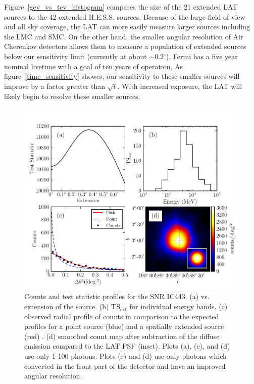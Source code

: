 \documentclass[12pt,preprint]{aastex}
\newcommand{\gev}{\text{GeV}\xspace}
\newcommand{\tev}{\text{TeV}\xspace}
\newcommand{\tsext}{{\ensuremath{\text{TS}_{\text{ext}}}}\xspace}
\newcommand{\ts}{\text{TS}\xspace}
\renewcommand{\deg}{\ensuremath{^\circ}\xspace}
\renewcommand{\approx}{\sim\!\xspace}
\begin{document}
Figure~\ref{gev_vs_tev_histogram} compares the size of the 21 extended
LAT sources to the 42 extended H.E.S.S. sources.  Because of the large
field of view and all sky coverage, the LAT can more easily measure
larger sources including the LMC and SMC.  On the other hand, the smaller
angular resolution of Air Cherenkov detectors allows them to measure a
population of extended sources below our sensitivity limit (currently at
about $\approx0.2\deg$).  Fermi has a five year nominal livetime with a
goal of ten years of operation.  As figure~\ref{time_sensitivity} showes,
our sensitivity to these smaller sources will improve by a factor greater
than $\sqrt{t}$.  With increased exposure, the LAT will likely begin to
resolve these smaller \tev sources.





\clearpage
\begin{figure}
  \begin{center}
    \includegraphics{ic443_plots/four_plots_ic443.pdf}
    \caption{
    Counts and test statistic profiles for the SNR IC443. (a) \ts
    vs. extension of the source. (b) \tsext for individual energy bands. (c)
    observed radial profile of counts in comparison to the expected profiles
    for a point source (blue) and a spatially extended source (red) . (d)
    smoothed count map after subtraction of the diffuse emission compared
    to the LAT PSF (inset).  Plots (a), (c), and (d) use only 1-100 \gev photons. 
    Plots (c) and (d)
    use only photons which converted in the front
    part of the detector and have an improved angular resolution.
    }
    \label{four_plots_ic443}
  \end{center}
\end{figure}
\end{document}
